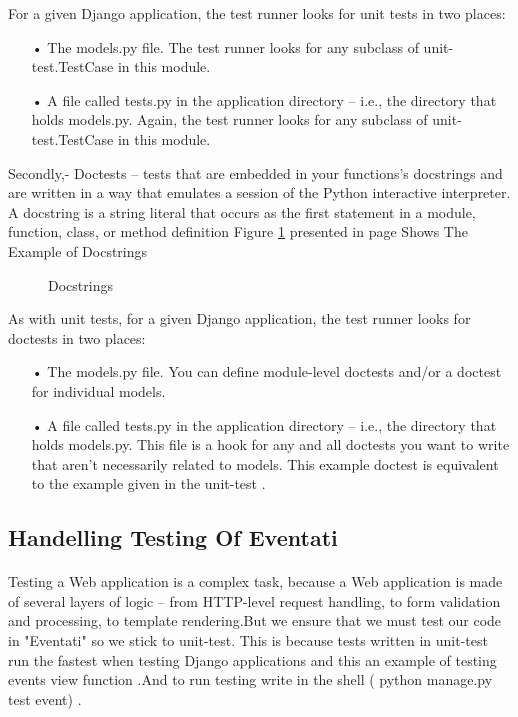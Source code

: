 \documentclass[12pt,a4paper,class,twoside,openany]{report}
\begin{document}
{For a given Django application, the test runner looks for unit tests in two places:
\begin{itemize}
\item[•]The models.py file. The test runner looks for any subclass of unit-test.TestCase in this module.
\item[•] A file called tests.py in the application directory – i.e., the directory that holds models.py. Again, the test runner looks for any subclass of unit-test.TestCase in this module.
\end{itemize}
  
Secondly,- Doctests – tests that are embedded in your functions's docstrings and are written in a way that emulates a session of the Python interactive interpreter. A docstring is a string literal that occurs as the first statement in a module, function, class, or method definition
Figure \ref{fg:4-27} presented in page \pageref{fg:4-27} Shows The Example of Docstrings
\begin{figure}
\begin{center}
\caption{ Docstrings }
\label{fg:4-27}
\end{center}
\end{figure}
As with unit tests, for a given Django application, the test runner looks for doctests in two places:
\begin{itemize}
\item[•]The models.py file. You can define module-level doctests and/or a doctest for individual models.
\item[•] A file called tests.py in the application directory – i.e., the directory that holds models.py. This file is a hook for any and all doctests you want to write that aren't necessarily related to models. 
This example doctest is equivalent to the example given in the unit-test .
\end{itemize}
\subsection{Handelling Testing Of Eventati}
\paragraph*{\hspace{.9 cm} } Testing a Web application is a complex task, because a Web application is made of several layers of logic – from HTTP-level request handling, to form validation and processing, to template rendering.But we ensure that we must test our code in "Eventati" so we stick to unit-test. This is because tests written in unit-test run the fastest when testing Django applications and this an example of testing events view function .And to run testing write in the shell ( python manage.py test event) .
\cleardoublepage
}
\end{document}
